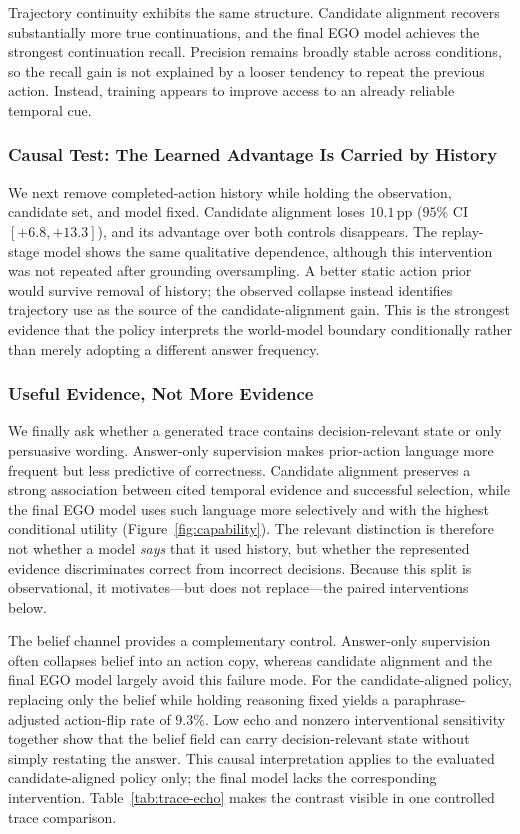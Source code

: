 \documentclass[letterpaper]{article}
\newcommand{\obs}[1]{\textcolor{measuredblue}{#1}}
\newcommand{\pp}{\,\mathrm{pp}}
\newcommand{\method}{\textsc{EGO}}
\begin{document}
Trajectory continuity exhibits the same structure.  Candidate alignment
recovers substantially more true continuations, and the final \method{} model
achieves the strongest continuation recall.  Precision remains broadly stable
across conditions, so the recall gain is not explained by a looser tendency
to repeat the previous action.  Instead, training appears to improve access
to an already reliable temporal cue.

\subsubsection{Causal Test: The Learned Advantage Is Carried by History}
\label{sec:er-history}

We next remove completed-action history while holding the observation,
candidate set, and model fixed.  Candidate alignment loses
\obs{$10.1\pp$} (\obs{$95\%$ CI $[+6.8,+13.3]$}), and its advantage over
both controls disappears.  The replay-stage model shows the same qualitative
dependence, although this intervention was not repeated after grounding
oversampling.  A better static action prior would survive removal of history;
the observed collapse instead identifies trajectory use as the source of the
candidate-alignment gain.  This is the strongest evidence that the policy
interprets the world-model boundary conditionally rather than merely adopting
a different answer frequency.

\subsubsection{Useful Evidence, Not More Evidence}
\label{sec:er-evidence}

We finally ask whether a generated trace contains decision-relevant state or
only persuasive wording.  Answer-only supervision makes prior-action language
more frequent but less predictive of correctness.  Candidate alignment
preserves a strong association between cited temporal evidence and successful
selection, while the final \method{} model uses such language more selectively
and with the highest conditional utility (Figure~\ref{fig:capability}).  The
relevant distinction is therefore not whether a model \emph{says} that it used
history, but whether the represented evidence discriminates correct from
incorrect decisions.  Because this split is observational, it motivates—but
does not replace—the paired interventions below.

The belief channel provides a complementary control.  Answer-only
supervision often collapses belief into an action copy, whereas candidate
alignment and the final \method{} model largely avoid this failure mode.
For the candidate-aligned policy, replacing only the belief while holding
reasoning fixed yields a paraphrase-adjusted action-flip rate of
\obs{$9.3\%$}.  Low echo and nonzero interventional sensitivity together show
that the belief field can carry decision-relevant state without simply
restating the answer.  This causal interpretation applies to the evaluated
candidate-aligned policy only; the final model lacks the corresponding
intervention.  Table~\ref{tab:trace-echo} makes the contrast visible in one
controlled trace comparison.
\end{document}
